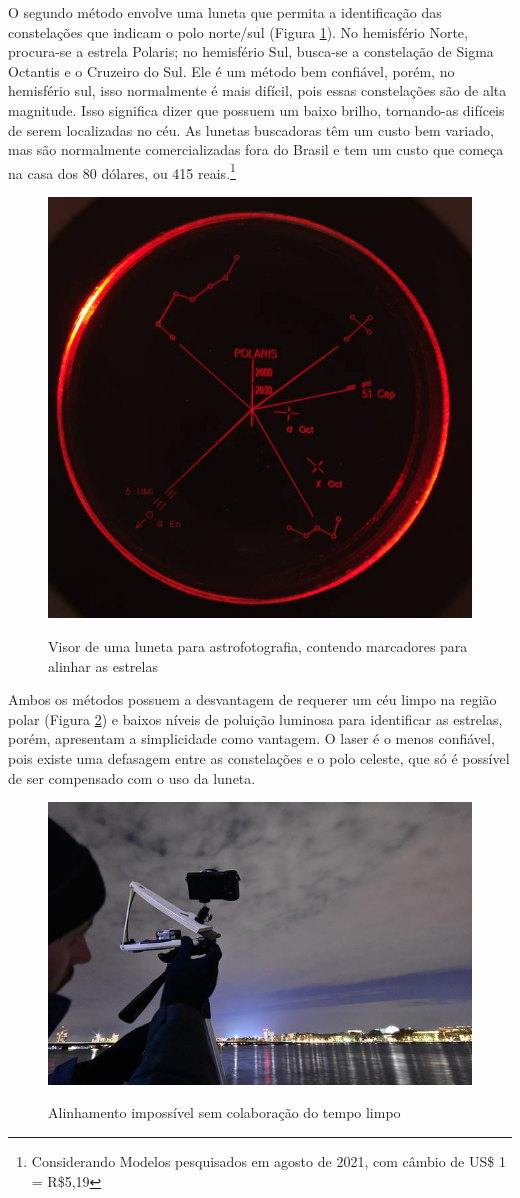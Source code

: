 O segundo método envolve uma luneta que permita a identificação das constelações que indicam o polo norte/sul (Figura \ref{fig:luneta}). No hemisfério Norte, procura-se a estrela Polaris; no hemisfério Sul, busca-se a constelação de Sigma Octantis e o Cruzeiro do Sul. Ele é um método bem confiável, porém, no hemisfério sul, isso normalmente é mais difícil, pois essas constelações são de alta magnitude. Isso significa dizer que possuem um baixo brilho, tornando-as difíceis de serem localizadas no céu. As lunetas buscadoras têm um custo bem variado, mas são normalmente comercializadas fora do Brasil e tem um custo que começa na casa dos 80 dólares, ou 415 reais.\footnote{Considerando Modelos pesquisados em agosto de 2021, com câmbio de US\$ 1 = R\$5,19}

 \begin{figure}[!htb]
	\centering
	\caption{Visor de uma luneta para astrofotografia, contendo marcadores para alinhar as estrelas}
	\includegraphics[width=0.5\linewidth]{figuras/luneta}
	\label{fig:luneta}
\end{figure}

Ambos os métodos possuem a desvantagem de requerer um céu limpo na região polar (Figura \ref{fig:temporuim}) e baixos níveis de poluição luminosa para identificar as estrelas, porém, apresentam a simplicidade como vantagem. O laser é o menos confiável, pois existe uma defasagem entre as constelações e o polo celeste, que só é possível de ser compensado com o uso da luneta. 

 \begin{figure}[!htb]
	\centering
	\caption{Alinhamento impossível sem colaboração do tempo limpo}
	\includegraphics[width=0.5\linewidth]{figuras/temporuim}
	\label{fig:temporuim}
\end{figure}


